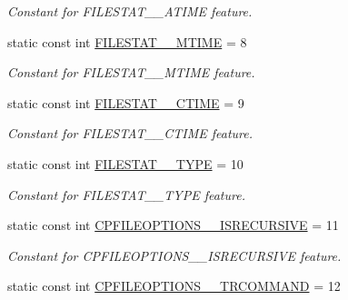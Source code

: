 \begin{DoxyCompactItemize}
\begin{DoxyCompactList}\small\item\em Constant for FILESTAT\_\-\_\-ATIME feature. \item\end{DoxyCompactList}\item 
\hypertarget{classFMS__Data_1_1FMS__DataPackage_a9832f3be7df73e4d377de357555b2f97}{
static const int \hyperlink{classFMS__Data_1_1FMS__DataPackage_a9832f3be7df73e4d377de357555b2f97}{FILESTAT\_\-\_\-MTIME} = 8}
\label{classFMS__Data_1_1FMS__DataPackage_a9832f3be7df73e4d377de357555b2f97}

\begin{DoxyCompactList}\small\item\em Constant for FILESTAT\_\-\_\-MTIME feature. \item\end{DoxyCompactList}\item 
\hypertarget{classFMS__Data_1_1FMS__DataPackage_a71bad98ad0805b95445a087802896b8b}{
static const int \hyperlink{classFMS__Data_1_1FMS__DataPackage_a71bad98ad0805b95445a087802896b8b}{FILESTAT\_\-\_\-CTIME} = 9}
\label{classFMS__Data_1_1FMS__DataPackage_a71bad98ad0805b95445a087802896b8b}

\begin{DoxyCompactList}\small\item\em Constant for FILESTAT\_\-\_\-CTIME feature. \item\end{DoxyCompactList}\item 
\hypertarget{classFMS__Data_1_1FMS__DataPackage_a4da65980e4fbf54574cc5ed729c3cab1}{
static const int \hyperlink{classFMS__Data_1_1FMS__DataPackage_a4da65980e4fbf54574cc5ed729c3cab1}{FILESTAT\_\-\_\-TYPE} = 10}
\label{classFMS__Data_1_1FMS__DataPackage_a4da65980e4fbf54574cc5ed729c3cab1}

\begin{DoxyCompactList}\small\item\em Constant for FILESTAT\_\-\_\-TYPE feature. \item\end{DoxyCompactList}\item 
\hypertarget{classFMS__Data_1_1FMS__DataPackage_a74354aff91659f3c5e37ea5b43a2519c}{
static const int \hyperlink{classFMS__Data_1_1FMS__DataPackage_a74354aff91659f3c5e37ea5b43a2519c}{CPFILEOPTIONS\_\-\_\-ISRECURSIVE} = 11}
\label{classFMS__Data_1_1FMS__DataPackage_a74354aff91659f3c5e37ea5b43a2519c}

\begin{DoxyCompactList}\small\item\em Constant for CPFILEOPTIONS\_\-\_\-ISRECURSIVE feature. \item\end{DoxyCompactList}\item 
\hypertarget{classFMS__Data_1_1FMS__DataPackage_ad5e4106279854425eb166d2648286ed6}{
static const int \hyperlink{classFMS__Data_1_1FMS__DataPackage_ad5e4106279854425eb166d2648286ed6}{CPFILEOPTIONS\_\-\_\-TRCOMMAND} = 12}
\label{classFMS__Data_1_1FMS__DataPackage_ad5e4106279854425eb166d2648286ed6}


\end{DoxyCompactItemize}
